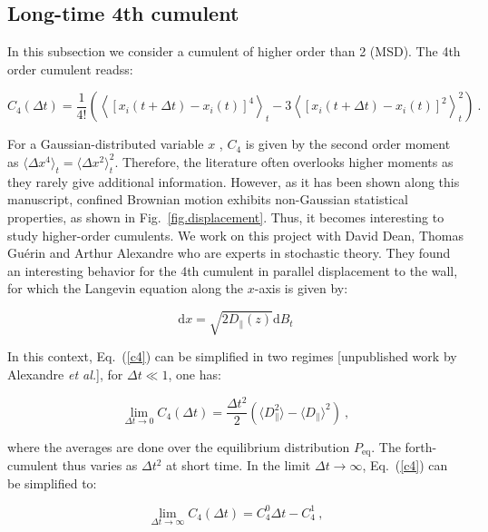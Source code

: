 \subsection{Long-time 4th cumulent}

In this subsection we consider a cumulent of higher order than 2 (\gls{MSD}). The 4th order cumulent readss:

\begin{equation}
	C_4 (\Delta t) = \frac{1}{4!} \left(
	\left\langle [ x_i(t + \Delta t) - x_i(t) ]^4 \right\rangle_t
	- 3\left\langle [ x_i(t + \Delta t) - x_i(t) ]^2 \right\rangle_t ^2
	\right) ~.
	\label{c4}
\end{equation}

For a Gaussian-distributed variable $x$ , $C_4$ is given by the second order moment as $ \langle \Delta x^4 \rangle_t  = \langle \Delta x ^2 \rangle _t ^2 $. Therefore, the literature often overlooks higher moments as they rarely give additional information. However, as it has been shown along this manuscript, confined Brownian motion exhibits non-Gaussian statistical properties, as shown in Fig.~\ref{fig.displacement}. Thus, it becomes interesting to study higher-order cumulents. We work on this project with David Dean, Thomas Guérin and Arthur Alexandre who are experts in stochastic theory. They found an interesting behavior for the 4th cumulent in parallel displacement to the wall, for which the Langevin equation along the $x$-axis is given by:

\begin{equation}
	\mathrm{d}x = \sqrt{2D_\parallel(z)} \mathrm{d}B_t
	\label{c4.dx}
\end{equation}

In this context, Eq.~(\ref{c4}) can be simplified in two regimes [unpublished work by Alexandre \textit{et al.}], for $\Delta t \ll 1 $, one has:

\begin{equation}
	\lim\limits_{\Delta t \rightarrow 0 } C_4 (\Delta t) = \frac{\Delta t ^2}{2}
	\left(
	\langle D_\parallel ^2 \rangle - \langle D _\parallel \rangle ^2 
	\right)~,
\end{equation}

where the averages are done over the equilibrium distribution $P_\mathrm{eq}$. The forth-cumulent thus varies as $\Delta t ^2$ at short time. In the limit $\Delta t \rightarrow \infty$, Eq.~(\ref{c4}) can be simplified to:

\begin{equation}
	\lim\limits_{\Delta t \rightarrow \infty } C_4 (\Delta t) = C_4 ^0 \Delta t - C^1 _4 ~,
\end{equation}

